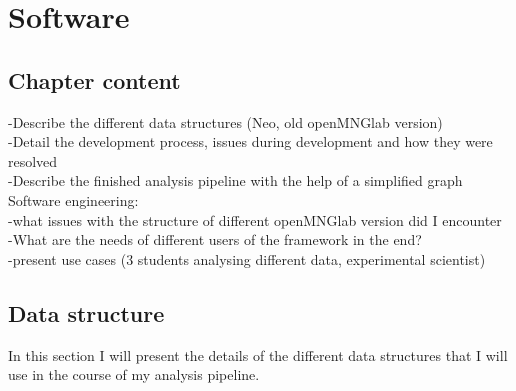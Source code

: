 \chapter{Software}
\section{Chapter content}
-Describe the different data structures (Neo, old openMNGlab version)\\
-Detail the development process, issues during development and how they were resolved\\
-Describe the finished analysis pipeline with the help of a simplified graph\\

Software engineering:\\
-what issues with the structure of different openMNGlab version did I encounter\\
-What are the needs of different users of the framework in the end?\\
-present use cases (3 students analysing different data, experimental scientist)

\section{Data structure}
In this section I will present the details of the different data structures that I will use in the course of my analysis pipeline.

